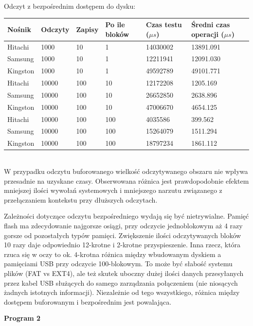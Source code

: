 \documentclass[a4paper,11pt]{article}
\begin{document}
Odczyt z bezpośrednim dostępem do dysku:\\
\begin{tabular}{|l|l|l|l|l|l|} \hline
	Nośnik & Odczyty & Zapisy & Po ile bloków & Czas testu ($\mu s$) & Średni czas operacji ($\mu s$)\\
	\hline \hline
	Hitachi & 1000 & 10 & 1 & 14030002 & 13891.091\\ \hline
	Samsung & 1000 & 10 & 1 & 12211941 & 12091.030\\ \hline
	Kingston & 1000 & 10 & 1 & 49592789 & 49101.771\\ \hline
	\hline
	Hitachi & 10000 & 100 & 10 & 12172208 & 1205.169\\ \hline
	Samsung & 10000 & 100 & 10 & 26652850 & 2638.896\\ \hline
	Kingston & 10000 & 100 & 10 & 47006670 & 4654.125\\ \hline
	\hline
	Hitachi & 10000 & 100 & 100 & 4035586 & 399.562\\ \hline
	Samsung & 10000 & 100 & 100 & 15264079 & 1511.294\\ \hline
	Kingston & 10000 & 100 & 100 & 18797234 & 1861.112\\ \hline
\end{tabular} \\

W przypadku odczytu buforowanego wielkość odczytywanego obszaru nie wpływa przesadnie na uzyskane czasy.
Obserwowana różnica jest prawdopodobnie efektem mniejszej ilości wywołań systemowych i mniejszego narzutu związanego z przełączaniem kontekstu przy dłuższych odczytach.

Zależności dotyczące odczytu bezpośredniego wydają się być nietrywialne. Pamięć flash ma zdecydowanie najgorsze
osiągi, przy odczycie jednoblokowym aż 4 razy gorsze od pozostałych typów pamięci. Zwiększenie ilości odczytywanych bloków 10 razy daje odpowiednio 12-krotne i 2-krotne przyspieszenie. Inna rzecz, która rzuca się w oczy to ok. 4-krotna różnica między wbudowanym dyskiem a pamięciami USB przy odczycie 100-blokowym. To może być słabość systemu plików (FAT vs EXT4), ale też skutek uboczny dużej ilości danych przesyłanych przez kabel USB służących do samego zarządzania połączeniem (nie niosących żadnych istotnych informacji). Niezależnie od tego wszystkiego, różnica między dostępem buforowanym i bezpośrednim jest powalająca.

\newpage

{\bf Program 2} \\
\end{document}
